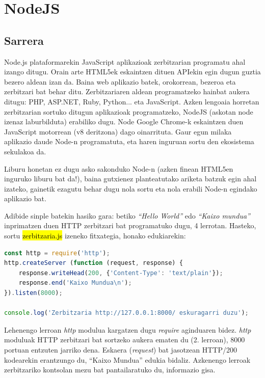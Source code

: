 \chapter{NodeJS}\label{chap:nodejs}
\section{Sarrera}
Node.js plataformarekin JavaScript aplikazioak zerbitzarian programatu ahal izango ditugu. Orain arte HTML5ek eskaintzen dituen APIekin egin dugun guztia bezero aldean izan da. Baina web aplikazio batek, orokorrean, bezeroa eta zerbitzari bat behar ditu. Zerbitzariaren aldean programatzeko hainbat aukera ditugu: PHP, ASP.NET, Ruby, Python... eta JavaScript. Azken lengoaia horretan zerbitzarian sortuko ditugun aplikazioak programatzeko, NodeJS (askotan node izenaz laburbilduta) erabiliko dugu. Node Google Chrome-k eskaintzen duen \mbox{JavaScript} motorrean (v8 deritzona) dago oinarrituta. Gaur egun milaka aplikazio daude Node-n programatuta, eta haren inguruan sortu den ekosistema sekulakoa da.

Liburu honetan ez dugu asko sakonduko Node-n (azken finean HTML5en inguruko liburu bat da!), baina gutxienez planteatutako ariketa batzuk egin ahal izateko, gainetik ezagutu behar dugu nola sortu eta nola erabili Node-n egindako aplikazio bat. 

Adibide sinple batekin hasiko gara: betiko \textit{``Hello World''} edo \textit{``Kaixo mundua''} inprimatzen duen HTTP zerbitzari bat programatuko dugu, 4 lerrotan. Hasteko, sortu \hl{zerbitzaria.js} izeneko fitxategia, honako edukiarekin:

\begin{lstlisting}[language=javascript]
const http = require('http');
http.createServer (function (request, response) {
	response.writeHead(200, {'Content-Type': 'text/plain'});
	response.end('Kaixo Mundua\n');
}).listen(8000);

console.log('Zerbitzaria http://127.0.0.1:8000/ eskuragarri duzu');
\end{lstlisting}

Lehenengo lerroan \textit{http} modulua kargatzen dugu \textit{require}  aginduaren bidez. \textit{http} moduluak HTTP zerbitzari bat sortzeko aukera ematen du (2. lerroan), 8000 portuan entzuten jarriko dena. Eskaera (\textit{request}) bat jasotzean  HTTP/200 kodearekin erantzungo du, ``Kaixo Mundua'' edukia bidaliz. Azkenengo lerroak zerbitzariko kontsolan mezu bat pantailaratuko du, informazio gisa.

